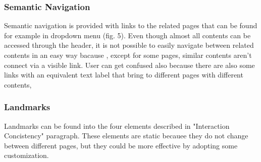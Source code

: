\subsubsection{Semantic Navigation}
Semantic navigation is provided with links to the related pages that can be found for example in dropdown menu (fig. 5). Even though almost all contents can be accessed through the header, it is not possible to easily navigate between related contents in an easy way bacause , except for some pages, similar contents aren't connect via a visible link. User can get confused also because there are also some links with an equivalent text label that bring to different pages with different contents, 

\subsubsection{Landmarks}
Landmarks can be found into the four elements described in "Interaction Concistency" paragraph. These elements are static becauee they do not change between different pages, but they could be more effective by adopting some customization.